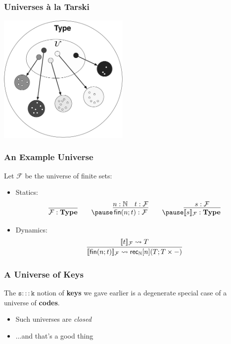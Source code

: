 \documentclass[12pt]{beamer}
\begin{document}
\begin{frame}
  \frametitle{Universes \`a la Tarski}
  \begin{center}
    \includegraphics[width=2.5in]{universe-interpretation.pdf}
  \end{center}
\end{frame}

\begin{frame}
  \frametitle{An Example Universe}
  \pause
  Let $\mathcal{F}$ be the universe of finite sets:
  \pause
  \begin{itemize}
    \item Statics:
      \pause
      \[
        \infer{\mathcal{F} : \mathbf{Type}}{}
        \qquad
        \pause
        \infer{\textsf{fin}(n; t) : \mathcal{F}}{n : \mathbb{N} & t:\mathcal{F}}
        \qquad
        \pause
        \infer{\llbracket s \rrbracket_\mathcal{F} : \mathbf{Type}}{s : \mathcal{F}}
      \]
      \pause
    \item Dynamics:
      \pause
      \[
        \infer{
          \llbracket\textsf{fin}(n; t)\rrbracket_\mathcal{F} \leadsto \textsf{rec}_\mathbb{N}[n](T; T\times -)
        }{
          \llbracket t\rrbracket_\mathcal{F} \leadsto T
        }
      \]
  \end{itemize}
\end{frame}

\begin{frame}
  \frametitle{A Universe of Keys}
  \pause
  The $\mathtt{s ::: k}$ notion of \textbf{keys} we gave earlier is a degenerate special case of a universe of \textbf{codes}.
  \pause
  \begin{itemize}
     \item Such universes are \emph{closed}
     \pause
     \item ...and that's a good thing
  \end{itemize}
\end{frame}
\end{document}
